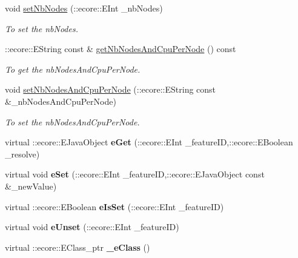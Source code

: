 \begin{DoxyCompactItemize}
void \hyperlink{classTMS__Data_1_1Job_abba933c1bb13df15e97069e20469bdc6}{setNbNodes} (::ecore::EInt \_\-nbNodes)
\begin{DoxyCompactList}\small\item\em To set the nbNodes. \item\end{DoxyCompactList}\item 
::ecore::EString const \& \hyperlink{classTMS__Data_1_1Job_aca3d55d4281c27c7ad763d195f9e421a}{getNbNodesAndCpuPerNode} () const 
\begin{DoxyCompactList}\small\item\em To get the nbNodesAndCpuPerNode. \item\end{DoxyCompactList}\item 
void \hyperlink{classTMS__Data_1_1Job_a21cbc986a7dbab4915447b1c091f156e}{setNbNodesAndCpuPerNode} (::ecore::EString const \&\_\-nbNodesAndCpuPerNode)
\begin{DoxyCompactList}\small\item\em To set the nbNodesAndCpuPerNode. \item\end{DoxyCompactList}\item 
\hypertarget{classTMS__Data_1_1Job_a0aa8c1dc7247fdc02fcc1b47fe84e9b5}{
virtual ::ecore::EJavaObject {\bfseries eGet} (::ecore::EInt \_\-featureID,::ecore::EBoolean \_\-resolve)}
\label{classTMS__Data_1_1Job_a0aa8c1dc7247fdc02fcc1b47fe84e9b5}

\item 
\hypertarget{classTMS__Data_1_1Job_a5417fb0880eb9e2a9842e2c0faf75adf}{
virtual void {\bfseries eSet} (::ecore::EInt \_\-featureID,::ecore::EJavaObject const \&\_\-newValue)}
\label{classTMS__Data_1_1Job_a5417fb0880eb9e2a9842e2c0faf75adf}

\item 
\hypertarget{classTMS__Data_1_1Job_aeb1d54c14a5fda6314afd670475c0f2f}{
virtual ::ecore::EBoolean {\bfseries eIsSet} (::ecore::EInt \_\-featureID)}
\label{classTMS__Data_1_1Job_aeb1d54c14a5fda6314afd670475c0f2f}

\item 
\hypertarget{classTMS__Data_1_1Job_a2a266251168375cdd3072431876f15c5}{
virtual void {\bfseries eUnset} (::ecore::EInt \_\-featureID)}
\label{classTMS__Data_1_1Job_a2a266251168375cdd3072431876f15c5}

\item 
\hypertarget{classTMS__Data_1_1Job_a0de24969bcdaf4e6efc8891da84b2ab3}{
virtual ::ecore::EClass\_\-ptr {\bfseries \_\-eClass} ()}
\label{classTMS__Data_1_1Job_a0de24969bcdaf4e6efc8891da84b2ab3}

\end{DoxyCompactItemize}
